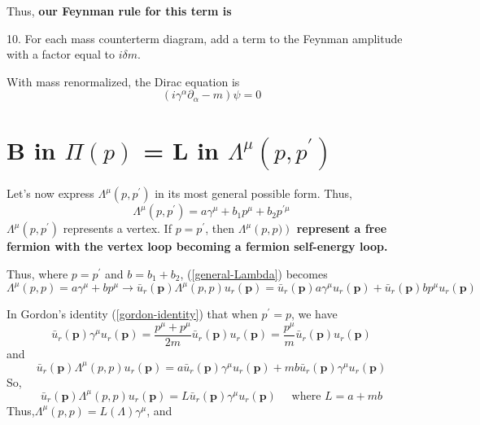 Thus, \textbf{our Feynman rule for this term is}
\begin{qt}
    10. For each mass counterterm diagram, add a term to the Feynman amplitude with a factor equal to $i\delta m$.
\end{qt}
With mass renormalized, the Dirac equation is
\begin{equation}\left(i \gamma^{\alpha} \partial_{\alpha}-m\right) \psi=0\end{equation}

\section{\texorpdfstring{B in $\Pi(p)$ = L in $\Lambda^{\mu}(p,p^{\prime})$}{TEXT}}

 Let's now express $\Lambda^{\mu}\left(p, p^{\prime}\right)$ in its most general possible form.  Thus,
 \begin{equation}
 \Lambda^{\mu}\left(p, p^{\prime}\right)=a \gamma^{\mu}+b_{1} p^{\mu}+b_{2} p^{\prime \mu}
 \label{general-Lambda}
 \end{equation}
 $\Lambda^{\mu}\left(p, p^{\prime}\right)$ represents a vertex. If $p=p^{\prime}$, then \textbf{$\Lambda^{\mu}\left(p, p)\right)$ represent a free fermion with the vertex loop becoming a fermion self-energy loop.}
 
 Thus, where $p=p^{\prime}$ and $b=b_{1}+b_{2}$, (\ref{general-Lambda}) becomes
 $$\Lambda^{\mu}(p, p)=a \gamma^{\mu}+b p^{\mu} \rightarrow \bar{u}_{r}(\mathbf{p}) \Lambda^{\mu}(p, p) u_{r}(\mathbf{p})=\bar{u}_{r}(\mathbf{p}) a \gamma^{\mu} u_{r}(\mathbf{p})+\bar{u}_{r}(\mathbf{p}) b p^{\mu} u_{r}(\mathbf{p})$$
 
 In Gordon's identity (\ref{gordon-identity}) that when $p^{\prime}=p$, we have
 $$\bar{u}_{r}(\mathbf{p}) \gamma^{\mu} u_{r}(\mathbf{p})=\frac{p^{\mu}+p^{\mu}}{2 m} \bar{u}_{r}(\mathbf{p}) u_{r}(\mathbf{p})=\frac{p^{\mu}}{m} \bar{u}_{r}(\mathbf{p}) u_{r}(\mathbf{p})$$
 and
 $$
 \bar{u}_{r}(\mathbf{p}) \Lambda^{\mu}(p, p) u_{r}(\mathbf{p})=a \bar{u}_{r}(\mathbf{p}) \gamma^{\mu} u_{r}(\mathbf{p})+m b \bar{u}_{r}(\mathbf{p}) \gamma^{\mu} u_{r}(\mathbf{p})
 $$
 So,
 $$\bar{u}_{r}(\mathbf{p}) \Lambda^{\mu}(p, p) u_{r}(\mathbf{p})=L \bar{u}_{r}(\mathbf{p}) \gamma^{\mu} u_{r}(\mathbf{p}) \quad \text { where } L=a+m b$$
 Thus,$\Lambda^{\mu}(p, p)=L(\Lambda) \gamma^{\mu}$, and
 

